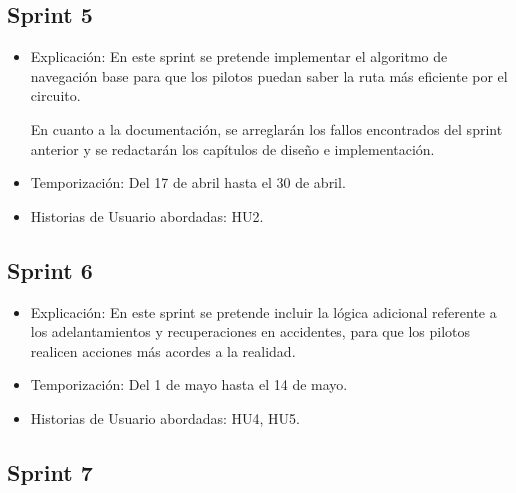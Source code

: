 \subsection{Sprint 5}
\begin{itemize}
    \item Explicación: En este sprint se pretende implementar el algoritmo de navegación base para que los pilotos puedan saber la ruta más eficiente por el circuito.


    En cuanto a la documentación, se arreglarán los fallos encontrados del sprint anterior y se redactarán los capítulos de diseño e implementación.

    \item Temporización: Del 17 de abril hasta el 30 de abril.
    \item Historias de Usuario abordadas: HU2.
\end{itemize}

\newpage

\subsection{Sprint 6}

\begin{itemize}
    \item Explicación: En este sprint se pretende incluir la lógica adicional referente a los adelantamientos y recuperaciones en accidentes, para que los pilotos realicen acciones más acordes a la realidad.
    

    \item Temporización: Del 1 de mayo hasta el 14 de mayo.
    \item Historias de Usuario abordadas: HU4, HU5.
\end{itemize}

\subsection{Sprint 7}

